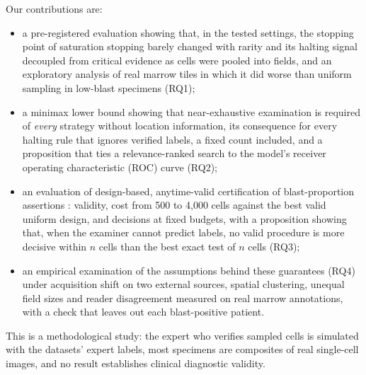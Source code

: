 \documentclass[journal]{IEEEtran}
\begin{document}
Our contributions are:
\begin{itemize}
\item a pre-registered evaluation showing that, in the tested settings, the stopping point of saturation stopping barely changed with rarity and its halting signal decoupled from critical evidence as cells were pooled into fields, and an exploratory analysis of real marrow tiles in which it did worse than uniform sampling in low-blast specimens (RQ1);
\item a minimax lower bound showing that near-exhaustive examination is required of \emph{every} strategy without location information, its consequence for every halting rule that ignores verified labels, a fixed count included, and a proposition that ties a relevance-ranked search to the model's receiver operating characteristic (ROC) curve (RQ2);
\item an evaluation of design-based, anytime-valid certification of blast-proportion assertions \cite{stark2023alpha,shekhar2023rlfa}: validity, cost from 500 to 4,000 cells against the best valid uniform design, and decisions at fixed budgets, with a proposition showing that, when the examiner cannot predict labels, no valid procedure is more decisive within $n$ cells than the best exact test of $n$ cells (RQ3);
\item an empirical examination of the assumptions behind these guarantees (RQ4) under acquisition shift on two external sources, spatial clustering, unequal field sizes and reader disagreement measured on real marrow annotations, with a check that leaves out each blast-positive patient.
\end{itemize}
This is a methodological study: the expert who verifies sampled cells is simulated with the datasets' expert labels, most specimens are composites of real single-cell images, and no result establishes clinical diagnostic validity.
\end{document}
